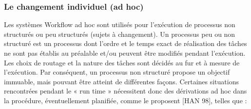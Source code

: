 \subsubsection{Le changement individuel (ad hoc) }
Les systèmes Workflow ad hoc sont utilisés pour l’exécution de processus non structurés
ou peu structurés (sujets à changement). Un processus peu ou non structuré est un processus
dont l’ordre et le temps exact de réalisation des tâches ne sont pas établis au préalable et/ou peuvent être modifiés pendant l’exécution. Les choix de routage et la nature des tâches sont décidés au fur et à mesure de l’exécution. Par conséquent, un processus non structuré propose un objectif immuable, mais pouvant être atteint de différentes façons. Certaines situations rencontrées pendant le « run time » nécessitent donc des dérivations ad hoc dans la procédure, éventuellement planifiée, comme le proposent [HAN 98], telles que :
